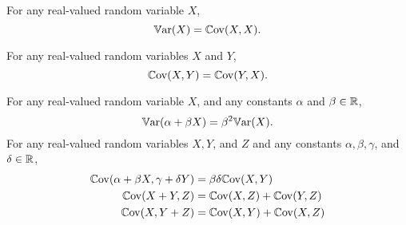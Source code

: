 \documentclass[10pt, a4paper]{article}
\begin{document}
\begin{property}
    For any real-valued random variable $X$,
    \[
    \mathbb{V}\mathrm{ar}(X) = \mathbb{C}\mathrm{ov}(X, X).
    \]
\end{property}
\begin{property}
    For any real-valued random variables $X$ and $Y$,
    \[
    \mathbb{C}\mathrm{ov}(X, Y) = \mathbb{C}\mathrm{ov}(Y, X).
    \]
\end{property}

\begin{corollary}
    For any real-valued random variable $X$,
    and any constants $\alpha$ and $\beta \in \mathbb{R}$,
    \[
    \mathbb{V}\mathrm{ar}(\alpha + \beta X) = \beta ^ 2 \mathbb{V}\mathrm{ar}(X).
    \]
    For any real-valued random variables $X, Y$, and $Z$ and any constants $\alpha, \beta, \gamma$, and $\delta \in \mathbb{R}$,
    \begin{subequations}
        \begin{align}
            \mathbb{C}\mathrm{ov}(\alpha + \beta X, \gamma + \delta Y) &= \beta\delta\mathbb{C}\mathrm{ov}(X, Y) \\
            \mathbb{C}\mathrm{ov}(X + Y, Z) &= \mathbb{C}\mathrm{ov}(X, Z) + \mathbb{C}\mathrm{ov}(Y, Z) \\
            \mathbb{C}\mathrm{ov}(X, Y + Z) &= \mathbb{C}\mathrm{ov}(X, Y) + \mathbb{C}\mathrm{ov}(X, Z)
        \end{align}
    \end{subequations}
\end{corollary}
\end{document}
